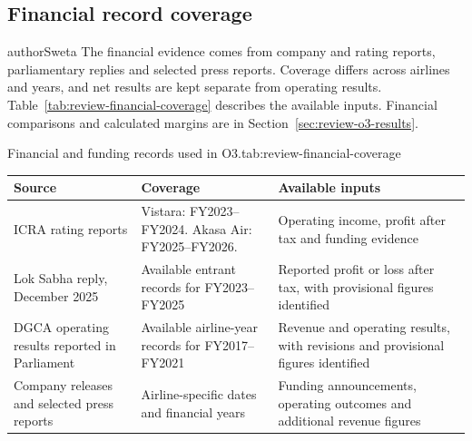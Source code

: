 \subsection{Financial record coverage}
\label{app:eda-financial-coverage}
\begin{mergedcontribution}{authorSweta}
The financial evidence comes from company and rating reports, parliamentary replies and selected press reports. Coverage differs across airlines and years, and net results are kept separate from operating results. Table~\ref{tab:review-financial-coverage} describes the available inputs. Financial comparisons and calculated margins are in Section~\ref{sec:review-o3-results}.

\begin{resultstable}{Financial and funding records used in O3.}{tab:review-financial-coverage}
\color{authorSweta}
\begin{tabular}{|>{\raggedright\arraybackslash}p{}|>{\raggedright\arraybackslash}p{}|>{\raggedright\arraybackslash}p{}|}
\hline
\textbf{Source} & \textbf{Coverage} & \textbf{Available inputs} \\
\hline
ICRA rating reports & Vistara: FY2023--FY2024. Akasa Air: FY2025--FY2026. & Operating income, profit after tax and funding evidence \\
\hline
Lok Sabha reply, December 2025 & Available entrant records for FY2023--FY2025 & Reported profit or loss after tax, with provisional figures identified \\
\hline
DGCA operating results reported in Parliament & Available airline-year records for FY2017--FY2021 & Revenue and operating results, with revisions and provisional figures identified \\
\hline
Company releases and selected press reports & Airline-specific dates and financial years & Funding announcements, operating outcomes and additional revenue figures \\
\hline
\end{tabular}
\par{}
\end{resultstable}
\end{mergedcontribution}
